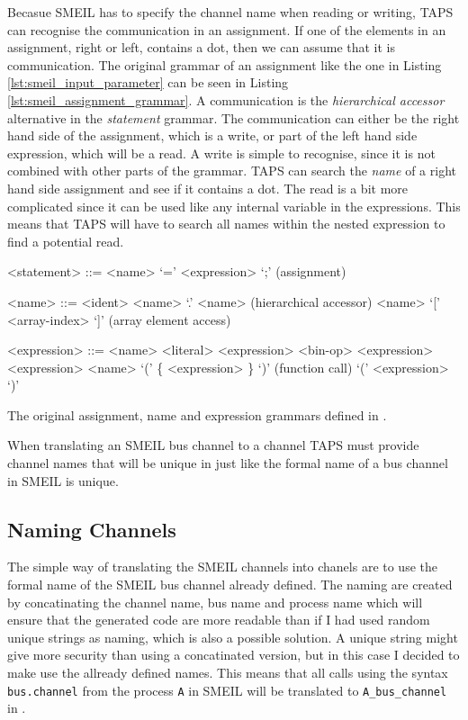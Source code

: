 Becasue SMEIL has to specify the channel name when reading or writing, TAPS can recognise the communication in an assignment. If one of the elements in an assignment, right or left, contains a dot, then we can assume that it is communication. The original grammar of an assignment like the one in Listing \ref{lst:smeil_input_parameter} can be seen in Listing \ref{lst:smeil_assignment_grammar}. A communication is the \textit{hierarchical accessor} alternative in the \textit{statement} grammar. The communication can either be the right hand side of the assignment, which is a write, or part of the left hand side expression, which will be a read. A write is simple to recognise, since it is not combined with other parts of the grammar. TAPS can search the \textit{name} of a right hand side assignment and see if it contains a dot. The read is a bit more complicated since it can be used like any internal variable in the expressions. This means that TAPS will have to search all names within the nested expression to find a potential read.
\begin{listing}
\begin{grammar}
<statement> ::= <name> `=' <expression> `;' (assignment)

<name> ::= <ident>
\alt <name> `.' <name> (hierarchical accessor)
\alt <name> `[' <array-index> `]' (array element access)

<expression> ::= <name>
\alt <literal>
\alt <expression> <bin-op> <expression>
 <expression>
\alt <name> `(' \{ <expression> \}  `)' (function call)
\alt `(' <expression> `)'


\end{grammar}
\caption{The original assignment, name and expression grammars defined in \cite{Asheim2018}.}
\label{lst:smeil_assignment_grammar}
\end{listing}

When translating an SMEIL bus channel to a \cspm{} channel TAPS must provide channel names that will be unique in \cspm{} just like the formal name of a bus channel in SMEIL is unique.
\subsection{Naming Channels}
The simple way of translating the SMEIL channels into \cspm{} chanels are to use the formal name of the SMEIL bus channel already defined. The naming are created by concatinating the channel name, bus name and process name which will ensure that the generated code are more readable than if I had used random unique strings as naming, which is also a possible solution. A unique string might give more security than using a concatinated version, but in this case I decided to make use the allready defined names. This means that all calls using the syntax \texttt{bus.channel} from the process \texttt{A} in SMEIL will be translated to \texttt{A\_bus\_channel} in \cspm{}.

